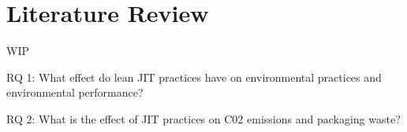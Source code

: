 \section{Literature Review}
WIP

RQ 1: What effect do lean JIT practices have on environmental practices and environmental performance?

RQ 2: What is the effect of JIT practices on C02 emissions and packaging waste?
